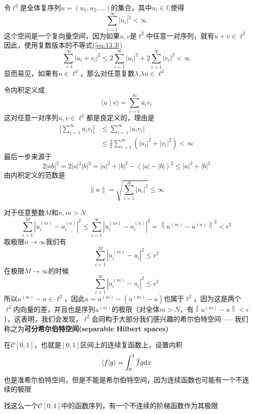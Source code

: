 \begin{eg}
    令\(\ell^2\)是全体复序列\(u=(u_1,u_2,...)\)的集合，其中\(u_i \in \mathbb{C}\)使得
    $$
\sum_{i=1}^{\infty}\left|u_{i}\right|^{2}<\infty
$$
这个空间是一个复向量空间，因为如果\(u,v\)是\(\ell^2\)中任意一对序列，就有\(u+v \in \ell^2\)\\
因此，使用复数版本的不等式(\ref{eq:13.3})
$$
\sum_{=1}^{\infty}\left|u_{i}+v_{i}\right|^{2} \leq 2 \sum_{i=1}^{\infty}\left|u_{i}\right|^{2}+2 \sum_{i=1}^{\infty}\left|v_{i}\right|^{2}<\infty
$$
显而易见，如果有\(u \in \ell^2\)，那么对任意复数\(\lambda\),\(\lambda u \in \ell^2\)

令内积定义成
$$
\langle u \mid v\rangle=\sum_{i=1}^{\infty} \overline{u_{i}} v_{i}
$$
这对任意一对序列\(u,v\in \ell^2\)都是良定义的，理由是
$$
\begin{aligned}
\left|\sum_{i=1}^{\infty} \overline{u_{i}} v_{i}\right| & \leq \sum_{i=1}^{\infty}\left|\overline{u_{i}} v_{i}\right| \\
& \leq \frac{1}{2} \sum_{i=1}^{\infty}\left(\left|u_{i}\right|^{2}+\left|v_{i}\right|^{2}\right)<\infty
\end{aligned}
$$
最后一步来源于
$$
2|\bar{a} b|^{2}=2|a|^{2}|b|^{2}=|a|^{2}+|b|^{2}-(|a|-|b|)^{2} \leq|a|^{2}+|b|^{2}
$$
由内积定义的范数是
$$
\|u\|=\sqrt{\sum_{i=1}^{\infty}\left|u_{i}\right|^{2}} \leq \infty
$$

对于任意整数\(M\)和\(n,m>N\)
$$
\sum_{i=1}^{M}\left|u_{i}^{(m)}-u_{i}^{(n)}\right|^{2} \leq \sum_{i=1}^{\infty}\left|u_{i}^{(m)}-u_{i}^{(n)}\right|^{2}=\left\|u^{(m)}-u^{(n)}\right\|^{2}<\epsilon^{2}
$$
取极限\(n\rightarrow\infty\)我们有
$$
\sum_{i=1}^{M}\left|u_{i}^{(m)}-u_{i}\right|^{2} \leq \epsilon^{2}
$$
在极限\(M\rightarrow\infty\)的时候
$$
\sum_{i=1}^{\infty}\left|u_{i}^{(m)}-u_{i}\right|^{2} \leq \epsilon^{2}
$$
所以\(u^{(m)}-u\in \ell^2\)，因此\(u=u^{(m)}-(u^{(m)}-u)\)也属于\(\ell^2\)，因为这是两个\(\ell^2\)内向量的差，并且也是序列\(u^{(m)}\)的极限（对全体\(m>N\)，有\(\left\lVert u^{(m)}-u\right\rVert <\epsilon\)），这表明，我们会发现，\(\ell^2\)会同构于大部分我们感兴趣的希尔伯特空间——我们称之为\textbf{可分希尔伯特空间(separable Hilbert spaces)}
\end{eg}
\begin{eg}
    在\(\mathcal{C}[0,1]\)，也就是\([0,1]\)区间上的连续复函数上，设置内积
    \[\braket{f|g}=\int_0^1 \overline{f}g \mathrm{d}x\]
    也是准希尔伯特空间，但是不能是希尔伯特空间，因为连续函数也可能有一个不连续的极限
\end{eg}
\begin{exercise}
    找这么一个\(\mathcal{C}[0,1]\)中的函数序列，有一个不连续的阶梯函数作为其极限
\end{exercise}
